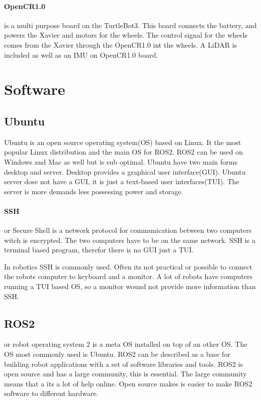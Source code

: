 \paragraph{OpenCR1.0} is a multi purpose board on the TurtleBot3\cite{opencr10}. This board connects the battery, and powers the Xavier and motors for the wheels. The control signal for the wheels comes from the Xavier through the OpenCR1.0 int the wheels. 
A LiDAR is included as well as an IMU on OpenCR1.0 board.


\section{Software}

\subsection{Ubuntu}

Ubuntu is an open source operating system(OS) based on Linux\cite{ubuntu}\cite{osi}. It the most popular Linux distribution and the main OS for ROS2. ROS2 can be used on Windows and Mac as well but is sub optimal. Ubuntu have two main forms desktop and server. Desktop provides a graphical user interface(GUI). Ubuntu server dose not have a GUI, it is just a text-based user interfaces(TUI). The server is more demands less possessing power and storage. 


\paragraph{SSH} or Secure Shell is a network protocol for communication between two computers witch is encrypted. The two computers have to be on the same network. SSH is a terminal based program, therefor there is no GUI just a TUI. 

In robotics SSH is commonly used. Often its not practical or possible to connect the robots computer to keyboard and a monitor. A lot of robots have computers running a TUI based OS, so a monitor wound not provide more information than SSH. 

\subsection{ROS2} or robot operating system 2 \cite{rosfoxydocs} is a meta OS installed on top of an other OS. The OS most commonly used is Ubuntu. ROS2 can be described as a base for building robot applications with a set of software libraries and tools. ROS2 is open source and has a large community, this is essential. The large community means that a its a lot of help online. Open source makes is easier to make ROS2 software to different hardware. 

